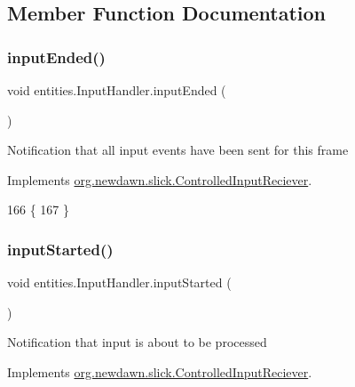 \subsection{Member Function Documentation}
\mbox{\label{classentities_1_1_input_handler_ab5b8a1ac155983d92cdbbfa2e592654b}} 
\subsubsection{\texorpdfstring{input\+Ended()}{inputEnded()}}
{\footnotesize\ttfamily void entities.\+Input\+Handler.\+input\+Ended (\begin{DoxyParamCaption}{ }\end{DoxyParamCaption})\hspace{0.3cm}{\ttfamily [inline]}}

Notification that all input events have been sent for this frame 

Implements \mbox{\hyperlink{interfaceorg_1_1newdawn_1_1slick_1_1_controlled_input_reciever_a61c6cde7cbf28a6969cafe3ec4f1c121}{org.\+newdawn.\+slick.\+Controlled\+Input\+Reciever}}.


\begin{DoxyCode}
166                              \{
167     \}
\end{DoxyCode}
\mbox{\label{classentities_1_1_input_handler_a3c2427c9f129a71286d592bf75dcb99f}} 
\subsubsection{\texorpdfstring{input\+Started()}{inputStarted()}}
{\footnotesize\ttfamily void entities.\+Input\+Handler.\+input\+Started (\begin{DoxyParamCaption}{ }\end{DoxyParamCaption})\hspace{0.3cm}{\ttfamily [inline]}}

Notification that input is about to be processed 

Implements \mbox{\hyperlink{interfaceorg_1_1newdawn_1_1slick_1_1_controlled_input_reciever_a718de21e9cd22f4c48ee87b5b8b32ed6}{org.\+newdawn.\+slick.\+Controlled\+Input\+Reciever}}.


